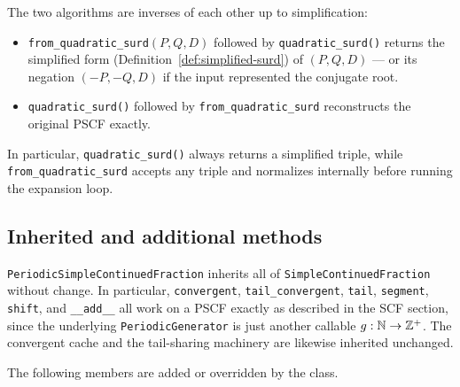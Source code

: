 \begin{remark}
  The two algorithms are inverses of each other up to simplification:
  \begin{itemize}
    \item \texttt{from\_quadratic\_surd}$(P, Q, D)$ followed by
          \texttt{quadratic\_surd()} returns the simplified form
          (Definition~\ref{def:simplified-surd}) of $(P, Q, D)$ — or its
          negation $(-P, -Q, D)$ if the input represented the conjugate root.
    \item \texttt{quadratic\_surd()} followed by
          \texttt{from\_quadratic\_surd} reconstructs the original PSCF
          exactly.
  \end{itemize}
  In particular, \texttt{quadratic\_surd()} always returns a simplified triple,
  while \texttt{from\_quadratic\_surd} accepts any triple and normalizes
  internally before running the expansion loop.
\end{remark}


\subsection{Inherited and additional methods}

\texttt{PeriodicSimpleContinuedFraction} inherits all of
\texttt{SimpleContinuedFraction} without change.  In particular,
\texttt{convergent}, \texttt{tail\_convergent}, \texttt{tail},
\texttt{segment}, \texttt{shift}, and \texttt{\_\_add\_\_} all work on a
PSCF exactly as described in the SCF section, since the underlying
\texttt{PeriodicGenerator} is just another callable $g: \mathbb{N} \to \mathbb{Z}^+$.
The convergent cache and the tail-sharing machinery are likewise inherited
unchanged.

The following members are added or overridden by the class.

